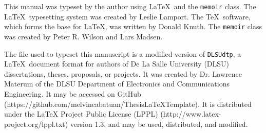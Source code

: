 This manual was typeset by the author using \LaTeX\  and the \texttt{memoir} class.
The \LaTeX\ typesetting system was created by Leslie Lamport.
The \TeX\ software, which forms the base for \LaTeX, was written by Donald Knuth.
The \texttt{memoir} class was created by Peter R. Wilson and Lars Madsen.

The file used to typeset this manuscript is a modified version of \texttt{DLSUdtp}, a \LaTeX\  document format for authors of De La Salle University (DLSU) dissertations, theses, proposals, or projects.
It was created by Dr. Lawrence Materum of the DLSU Department of Electronics and Communications Engineering.
It may be accessed on GitHub (https://github.com/melvincabatuan/ThesisLaTeXTemplate).
It is distributed under the LaTeX Project Public License (LPPL) (http://www.latex-project.org/lppl.txt) version 1.3, and may be used, distributed, and modified. 